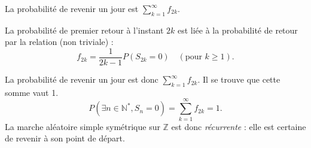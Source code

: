 La probabilité de revenir un jour est $\sum_{k=1}^\infty f_{2k}$.
\begin{lemma}
La probabilité de premier retour à l'instant $2k$ est liée à la probabilité de retour par la relation (non triviale) :
\[
f_{2k} = \frac{1}{2k-1} P(S_{2k}=0) \quad (\text{pour } k \ge 1).
\]
\end{lemma}
La probabilité de revenir un jour est donc $\sum_{k=1}^\infty f_{2k}$. Il se trouve que cette somme vaut 1.
\[
P(\exists n \in \mathbb{N}^*, S_n = 0) = \sum_{k=1}^\infty f_{2k} = 1.
\]
La marche aléatoire simple symétrique sur $\mathbb{Z}$ est donc \emph{récurrente} : elle est certaine de revenir à son point de départ.
